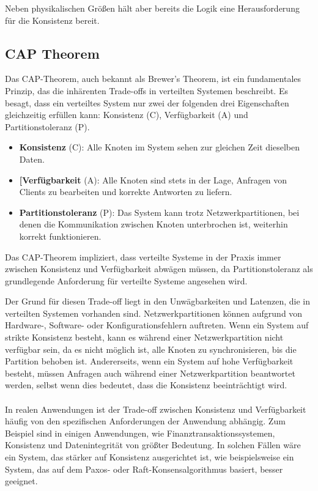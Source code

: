 Neben physikalischen Größen hält aber bereits die Logik eine Herausforderung für die Konsistenz  bereit. 

\subsection{CAP Theorem}
Das CAP-Theorem, auch bekannt als Brewer's Theorem, ist ein fundamentales Prinzip, das die inhärenten Trade-offs in verteilten Systemen beschreibt. Es besagt, dass ein verteiltes System nur zwei der folgenden drei Eigenschaften gleichzeitig erfüllen kann: Konsistenz (C), Verfügbarkeit (A) und Partitionstoleranz (P).
\begin{itemize}
\item \textbf{Konsistenz} (C): Alle Knoten im System sehen zur gleichen Zeit dieselben Daten.
\item \textbf{[Verfügbarkeit} (A): Alle Knoten sind stets in der Lage, Anfragen von Clients zu bearbeiten und korrekte Antworten zu liefern.
\item \textbf{Partitionstoleranz} (P): Das System kann trotz Netzwerkpartitionen, bei denen die Kommunikation zwischen Knoten unterbrochen ist, weiterhin korrekt funktionieren.
\end{itemize}

Das CAP-Theorem impliziert, dass verteilte Systeme in der Praxis immer zwischen Konsistenz und Verfügbarkeit abwägen müssen, da Partitionstoleranz als grundlegende Anforderung für verteilte Systeme angesehen wird.

Der Grund für diesen Trade-off liegt in den Unwägbarkeiten und Latenzen, die in verteilten Systemen vorhanden sind. Netzwerkpartitionen können aufgrund von Hardware-, Software- oder Konfigurationsfehlern auftreten. Wenn ein System auf strikte Konsistenz besteht, kann es während einer Netzwerkpartition nicht verfügbar sein, da es nicht möglich ist, alle Knoten zu synchronisieren, bis die Partition behoben ist. Andererseits, wenn ein System auf hohe Verfügbarkeit besteht, müssen Anfragen auch während einer Netzwerkpartition beantwortet werden, selbst wenn dies bedeutet, dass die Konsistenz beeinträchtigt wird.
\\\\
In realen Anwendungen ist der Trade-off zwischen Konsistenz und Verfügbarkeit häufig von den spezifischen Anforderungen der Anwendung abhängig. Zum Beispiel sind in einigen Anwendungen, wie Finanztransaktionssystemen, Konsistenz und Datenintegrität von größter Bedeutung. In solchen Fällen wäre ein System, das stärker auf Konsistenz ausgerichtet ist, wie beispielsweise ein System, das auf dem Paxos- oder Raft-Konsensalgorithmus basiert, besser geeignet.

